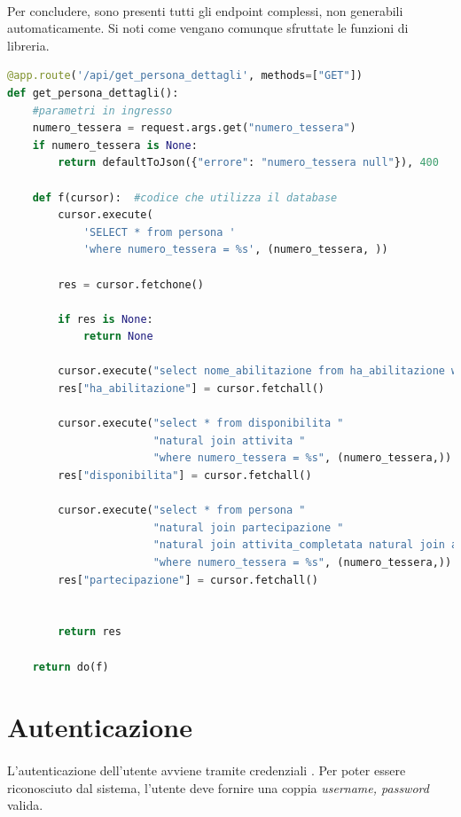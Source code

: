 \documentclass[12pt,a4paper,twoside,english,italian]{book}
\begin{document}
\paragraph{} Per concludere, sono presenti tutti gli endpoint complessi, non generabili automaticamente. Si noti come vengano comunque sfruttate le funzioni di libreria.

\begin{lstlisting}[language=python, caption=Esempio di endpoint non generabile]
@app.route('/api/get_persona_dettagli', methods=["GET"])
def get_persona_dettagli():
    #parametri in ingresso
    numero_tessera = request.args.get("numero_tessera")
    if numero_tessera is None:
        return defaultToJson({"errore": "numero_tessera null"}), 400

    def f(cursor):  #codice che utilizza il database
        cursor.execute(
            'SELECT * from persona '
            'where numero_tessera = %s', (numero_tessera, ))

        res = cursor.fetchone()

        if res is None:
            return None

        cursor.execute("select nome_abilitazione from ha_abilitazione where numero_tessera = %s", (numero_tessera, ))
        res["ha_abilitazione"] = cursor.fetchall()

        cursor.execute("select * from disponibilita "
                       "natural join attivita "
                       "where numero_tessera = %s", (numero_tessera,))
        res["disponibilita"] = cursor.fetchall()

        cursor.execute("select * from persona "
                       "natural join partecipazione "
                       "natural join attivita_completata natural join attivita "
                       "where numero_tessera = %s", (numero_tessera,))
        res["partecipazione"] = cursor.fetchall()


        return res

    return do(f)
\end{lstlisting}

\section{Autenticazione}

\paragraph{} L'autenticazione dell'utente avviene tramite credenziali \cite{password}. Per poter essere riconosciuto dal sistema, l'utente deve fornire una coppia \emph{username, password} valida. 
\end{document}
